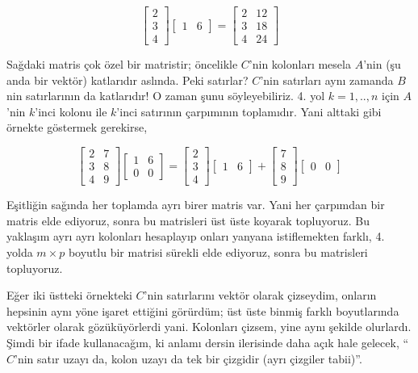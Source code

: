 \documentclass[12pt,fleqn]{article}\usepackage{../../common}
\begin{document}
$$ 
\left[\begin{array}{r}
2 \\ 3 \\ 4
\end{array}\right]
\left[\begin{array}{rr}
1 & 6
\end{array}\right]
=
\left[\begin{array}{rr}
2 & 12 \\
3 & 18 \\
4 & 24
\end{array}\right]
 $$

Sağdaki matris çok özel bir matristir; öncelikle $C$'nin kolonları mesela
$A$'nin (şu anda bir vektör) katlarıdır aslında. Peki satırlar?  $C$'nin
satırları aynı zamanda $B$ nin satırlarının da katlarıdır! O zaman şunu
söyleyebiliriz. 4. yol $k=1,..,n$ için $A$'nin $k$'inci kolonu ile
$k$'inci satırının çarpımının toplamıdır. Yani alttaki gibi örnekte
göstermek gerekirse, 

$$ 
\left[\begin{array}{rr}
2 & 7 \\
3 & 8 \\
4 & 9
\end{array}\right]
\left[\begin{array}{rr}
1 & 6 \\
0 & 0
\end{array}\right]
=
\left[\begin{array}{r}
2 \\ 3\\ 4
\end{array}\right]
\left[\begin{array}{rr}
1 & 6
\end{array}\right] 
+
\left[\begin{array}{r}
7 \\ 8\\ 9
\end{array}\right]
\left[\begin{array}{rr}
0 & 0
\end{array}\right] 
 $$

Eşitliğin sağında her toplamda ayrı birer matris var. Yani her çarpımdan
bir matris elde ediyoruz, sonra bu matrisleri üst üste koyarak
topluyoruz. Bu yaklaşım ayrı ayrı kolonları hesaplayıp onları yanyana
istiflemekten farklı, 4. yolda $m \times p$ boyutlu bir matrisi sürekli
elde ediyoruz, sonra bu matrisleri topluyoruz. 

Eğer iki üstteki örnekteki $C$'nin satırlarını vektör olarak çizseydim,
onların hepsinin aynı yöne işaret ettiğini görürdüm; üst üste binmiş farklı
boyutlarında vektörler olarak gözüküyörlerdi yani. Kolonları çizsem, yine
aynı şekilde olurlardı. Şimdi bir ifade kullanacağım, ki anlamı dersin
ilerisinde daha açık hale gelecek, ``$C$'nin satır uzayı da, kolon uzayı da
tek bir çizgidir (ayrı çizgiler tabii)''.
\end{document}
